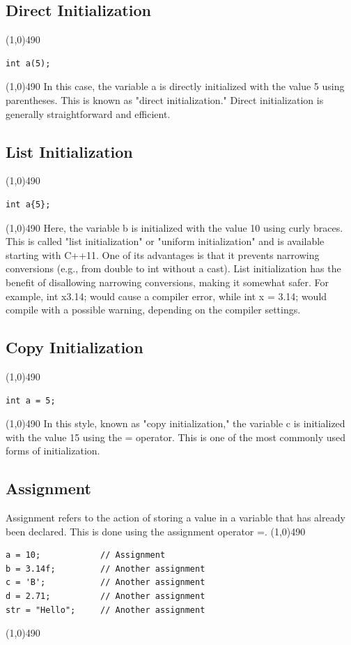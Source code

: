 \documentclass{report}
\begin{document}
    \bigbreak \noindent 
    \subsection{Direct Initialization}
    \bigbreak \noindent 
    \line(1,0){490}
    \begin{verbatim}
int a(5);
    \end{verbatim}
    \line(1,0){490}
    \bigbreak \noindent 
    In this case, the variable a is directly initialized with the value 5 using parentheses. This is known as "direct initialization." Direct initialization is generally straightforward and efficient.

    \bigbreak \noindent 
    \subsection{List Initialization}
    \bigbreak \noindent 
    \line(1,0){490}
    \begin{verbatim}
int a{5};
    \end{verbatim}
    \line(1,0){490}
    \bigbreak \noindent 
    Here, the variable b is initialized with the value 10 using curly braces. This is called "list initialization" or "uniform initialization" and is available starting with C++11. One of its advantages is that it prevents narrowing conversions (e.g., from double to int without a cast).
    \bigbreak \noindent 
    List initialization has the benefit of disallowing narrowing conversions, making it somewhat safer. For example, int x{3.14}; would cause a compiler error, while int x = 3.14; would compile with a possible warning, depending on the compiler settings.

    \bigbreak \noindent 
    \subsection{Copy Initialization}
    \bigbreak \noindent 
    \line(1,0){490}
    \begin{verbatim}
int a = 5;
    \end{verbatim}
    \line(1,0){490}
    \bigbreak \noindent 
    In this style, known as "copy initialization," the variable c is initialized with the value 15 using the = operator. This is one of the most commonly used forms of initialization.



    \bigbreak \noindent 
    \subsection{Assignment}
    \bigbreak \noindent 
    Assignment refers to the action of storing a value in a variable that has already been declared. This is done using the assignment operator =.
    \bigbreak \noindent 
    \line(1,0){490}
    \begin{verbatim}
a = 10;            // Assignment
b = 3.14f;         // Another assignment
c = 'B';           // Another assignment
d = 2.71;          // Another assignment
str = "Hello";     // Another assignment
    \end{verbatim}
    \line(1,0){490}
    \bigbreak \noindent 
\end{document}
